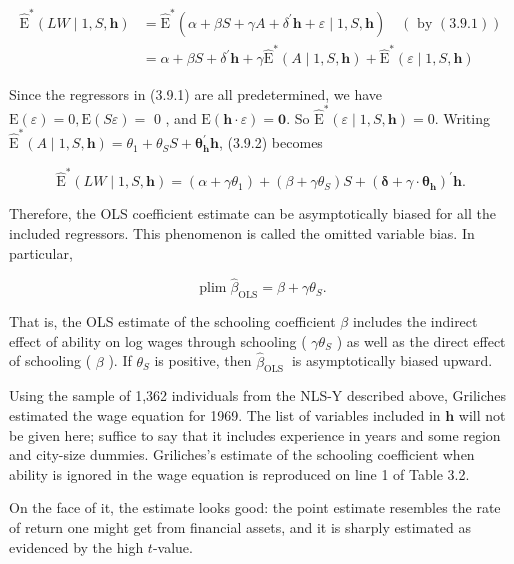 \documentclass[10pt]{article}
\begin{document}
\begin{align*}
\widehat{\mathrm{E}}^{*}(L W \mid 1, S, \mathbf{h}) & =\widehat{\mathrm{E}}^{*}\left(\alpha+\beta S+\gamma A+\delta^{\prime} \mathbf{h}+\varepsilon \mid 1, S, \mathbf{h}\right) \quad(\text { by }(3.9 .1)) \\
& =\alpha+\beta S+\delta^{\prime} \mathbf{h}+\gamma \widehat{\mathrm{E}}^{*}(A \mid 1, S, \mathbf{h})+\widehat{\mathrm{E}}^{*}(\varepsilon \mid 1, S, \mathbf{h}) \tag{3.9.2}
\end{align*}


Since the regressors in (3.9.1) are all predetermined, we have $\mathrm{E}(\varepsilon)=0, \mathrm{E}(S \varepsilon)=$ 0 , and $\mathrm{E}(\mathbf{h} \cdot \varepsilon)=\mathbf{0}$. So $\widehat{\mathrm{E}}^{*}(\varepsilon \mid 1, S, \mathbf{h})=0$. Writing $\widehat{\mathrm{E}}^{*}(A \mid 1, S, \mathbf{h})=\theta_{1}+\theta_{S} S+ \boldsymbol{\theta}_{\mathbf{h}}^{\prime} \mathbf{h}$, (3.9.2) becomes

$$
\widehat{\mathrm{E}}^{*}(L W \mid 1, S, \mathbf{h})=\left(\alpha+\gamma \theta_{1}\right)+\left(\beta+\gamma \theta_{S}\right) S+\left(\boldsymbol{\delta}+\gamma \cdot \boldsymbol{\theta}_{\mathbf{h}}\right)^{\prime} \mathbf{h} .
$$

Therefore, the OLS coefficient estimate can be asymptotically biased for all the included regressors. This phenomenon is called the omitted variable bias. In particular,

$$
\operatorname{plim} \widehat{\beta}_{\mathrm{OLS}}=\beta+\gamma \theta_{S} .
$$

That is, the OLS estimate of the schooling coefficient $\beta$ includes the indirect effect of ability on log wages through schooling ( $\gamma \theta_{S}$ ) as well as the direct effect of schooling ( $\beta$ ). If $\theta_{S}$ is positive, then $\widehat{\beta}_{\text {OLS }}$ is asymptotically biased upward.

Using the sample of 1,362 individuals from the NLS-Y described above, Griliches estimated the wage equation for 1969. The list of variables included in $\mathbf{h}$ will not be given here; suffice to say that it includes experience in years and some region and city-size dummies. Griliches's estimate of the schooling coefficient when ability is ignored in the wage equation is reproduced on line 1 of Table 3.2.

On the face of it, the estimate looks good: the point estimate resembles the rate of return one might get from financial assets, and it is sharply estimated as evidenced by the high $t$-value.
\end{document}
